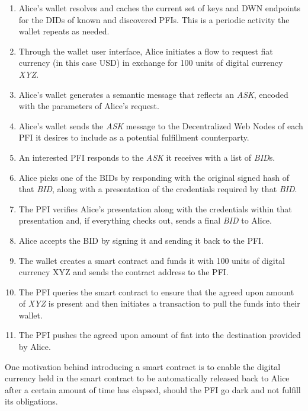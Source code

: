 \documentclass[11pt]{article}
\begin{document}
\begin{enumerate}
	\item Alice’s wallet resolves and caches the current set of keys and DWN endpoints for the DIDs of known and discovered PFIs. This is a periodic activity the wallet repeats as needed.

	\item Through the wallet user interface, Alice initiates a flow to request fiat currency (in this case USD) in exchange for 100 units of digital currency \textit{XYZ}.

	\item Alice’s wallet generates a semantic message that reflects an \textit{ASK}, encoded with the parameters of Alice’s request.  

	\item Alice’s wallet sends the \textit{ASK} message to the Decentralized Web Nodes of each PFI it desires to include as a potential fulfillment counterparty.

	\item An interested PFI responds to the \textit{ASK} it receives with a list of \textit{BID}s. 

	\item Alice picks one of the BIDs by responding with the original signed hash of that \textit{BID}, along with a presentation of the credentials required by that \textit{BID}. 

	\item The PFI verifies Alice’s presentation along with the credentials within that presentation and, if everything checks out, sends a final \textit{BID} to Alice.

	\item Alice accepts the BID by signing it and sending it back to the PFI.

	\item The wallet creates a smart contract and funds it with 100 units of digital currency XYZ and sends the contract address to the PFI.

	\item The PFI queries the smart contract to ensure that the agreed upon amount of \textit{XYZ} is present and then initiates a transaction to pull the funds into their wallet.

	\item The PFI pushes the agreed upon amount of fiat into the destination provided by Alice.

\vspace{1\baselineskip}
\end{enumerate}
One motivation behind introducing a smart contract is to enable the digital currency held in the smart contract to be automatically released back to Alice after a certain amount of time has elapsed, should the PFI go dark and not fulfill its obligations.
\end{document}
